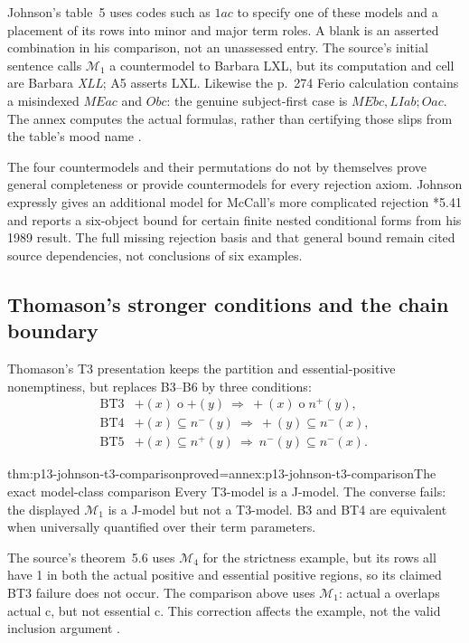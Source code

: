Johnson's table~5 uses codes such as \(1ac\) to specify one of these models
and a placement of its rows into minor and major term roles. A blank is an
asserted combination in his comparison, not an unassessed entry. The source's
initial sentence calls \(\mathcal M_1\) a countermodel to Barbara LXL,
but its computation and cell are Barbara \emph{XLL}; A5 asserts LXL.
Likewise the p.~274 Ferio calculation contains a misindexed \(MEac\)
and \(Obc\): the genuine subject-first case is
\(MEbc,LIab;Oac\). The annex computes the actual formulas, rather than
certifying those slips from the table's mood name
\parencite[pp.~273--277]{Johnson2004ModalSyllogisms}.

The four countermodels and their permutations do not by themselves prove
general completeness or provide countermodels for every rejection axiom.
Johnson expressly gives an additional model for McCall's more complicated
rejection *5.41 and reports a six-object bound for certain finite nested
conditional forms from his 1989 result. The full missing rejection basis and
that general bound remain cited source dependencies, not conclusions of six
examples.

\subsection{Thomason's stronger conditions and the chain boundary}
\label{sec:p13-johnson-mccall-t3-chain}

Thomason's T3 presentation keeps the partition and essential-positive
nonemptiness, but replaces B3--B6 by three conditions:
\[
\begin{array}{ll}
\mathrm{BT3}&+(x)\mathbin{o}+(y)\ \Longrightarrow\ +(x)\mathbin{o}n^{+}(y),\\
\mathrm{BT4}&+(x)\subseteq n^{-}(y)\ \Longrightarrow\ +(y)\subseteq n^{-}(x),\\
\mathrm{BT5}&+(x)\subseteq n^{+}(y)\ \Longrightarrow\ n^{-}(y)\subseteq n^{-}(x).
\end{array}
\]

\begin{hbtheorem}{thm:p13-johnson-t3-comparison}{proved=annex:p13-johnson-t3-comparison}{The exact model-class comparison}
Every T3-model is a J-model. The converse fails: the displayed
\(\mathcal M_1\) is a J-model but not a T3-model. B3 and BT4 are
equivalent when universally quantified over their term parameters.
\end{hbtheorem}

The source's theorem~5.6 uses \(\mathcal M_4\) for the strictness example,
but its rows all have 1 in both the actual positive and essential positive
regions, so its claimed BT3 failure does not occur. The comparison above uses
\(\mathcal M_1\): actual a overlaps actual c, but not essential c.
This correction affects the example, not the valid inclusion argument
\parencite[pp.~278--279]{Johnson2004ModalSyllogisms}.

